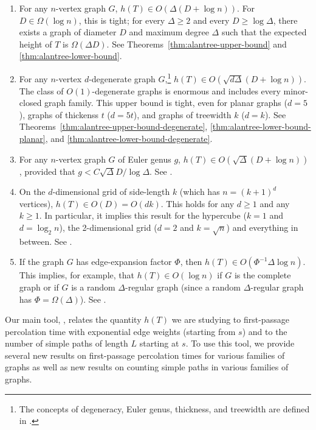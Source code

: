 \documentclass[lotsofwhite]{patmorin}
\begin{document}
\begin{enumerate}
  \item For any $n$-vertex graph $G$, $h(T)\in O(\Delta(D+\log n))$.
  For $D\in \Omega(\log n)$, this is tight; for every $\Delta\ge 2$ and every
  $D \ge \log\Delta$, there exists a graph of diameter $D$ and
  maximum degree $\Delta$ such that the expected height of $T$ is
  $\Omega(\Delta D)$.  See Theorems~\ref{thm:alantree-upper-bound}
  and \ref{thm:alantree-lower-bound}.

  \item For any $n$-vertex $d$-degenerate graph $G$,\footnote{The
  concepts of degeneracy, Euler genus, thickness, and treewidth
  are defined in .} $h(T)\in
  O(\sqrt{d\Delta}(D+\log n))$.  The class of $O(1)$-degenerate
  graphs is enormous and includes every minor-closed graph family.
  This upper bound is tight, even for planar graphs ($d=5$),
  graphs of thickenss $t$ ($d=5t$), and graphs of treewidth $k$
  ($d=k$).  See Theorems~\ref{thm:alantree-upper-bound-degenerate},
  \ref{thm:alantree-lower-bound-planar},
  and \ref{thm:alantree-lower-bound-degenerate}.

  \item For any $n$-vertex graph $G$ of Euler genus $g$,
  $h(T)\in O(\sqrt{\Delta}(D+\log n))$, provided that $g <
  C\sqrt{\Delta}D/\log\Delta$.  See .

  \item On the $d$-dimensional grid of side-length $k$ (which has
  $n=(k+1)^d$ vertices), $h(T)\in O(D)=O(dk)$. This holds for any $d\ge
  1$ and any $k\ge 1$.  In particular, it implies this result for the
  hypercube ($k=1$ and $d=\log_2 n$), the 2-dimensional grid ($d=2$
  and $k=\sqrt{n}$) and everything in between.  See .

  \item If the graph $G$ has edge-expansion factor $\Phi$, then
  $h(T)\in O(\Phi^{-1}\Delta\log n)$.  This implies, for example,
  that $h(T)\in O(\log n)$ if $G$ is the complete graph or if $G$ is
  a random $\Delta$-regular graph (since a random $\Delta$-regular graph has
  $\Phi=\Omega(\Delta)$).  See .
\end{enumerate}

Our main tool, , relates the quantity $h(T)$ we are
studying to first-passage percolation time with exponential edge weights
(starting from $s$) and to the number of simple paths of length $L$
starting at $s$.  To use this tool, we provide several new results on
first-passage percolation times for various families of graphs as well
as new results on counting simple paths in various families of graphs.
\end{document}
